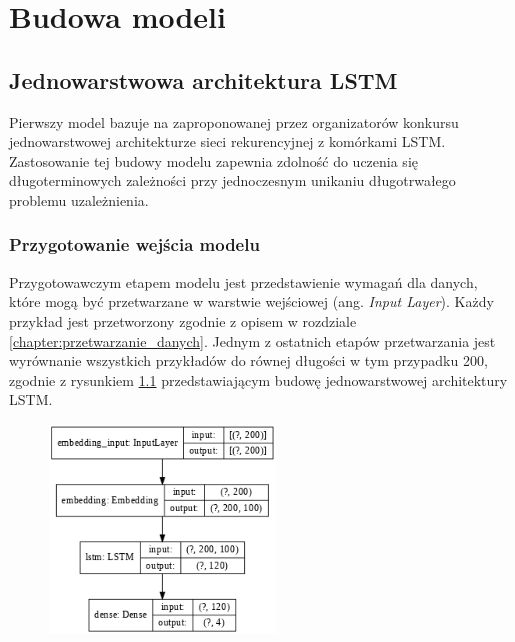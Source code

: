 \chapter{Budowa modeli}

\section{Jednowarstwowa architektura LSTM}
\label{section:one_lstm}

Pierwszy model bazuje na zaproponowanej przez organizatorów konkursu jednowarstwowej architekturze sieci rekurencyjnej z komórkami LSTM. Zastosowanie tej budowy modelu zapewnia zdolność do uczenia się długoterminowych zależności przy jednoczesnym unikaniu długotrwałego problemu uzależnienia. 

\subsection{Przygotowanie wejścia modelu}

Przygotowawczym etapem modelu jest przedstawienie wymagań dla danych, które mogą być przetwarzane w warstwie wejściowej (ang. \textit{Input Layer}). Każdy przykład jest przetworzony zgodnie z opisem w rozdziale \ref{chapter:przetwarzanie_danych}. Jednym z ostatnich etapów przetwarzania jest wyrównanie wszystkich przykładów do równej długości w tym przypadku 200, zgodnie z rysunkiem \ref{rys:lstm_one_graph} przedstawiającym budowę jednowarstwowej architektury LSTM.

\begin{figure}[t]
\centering\includegraphics[width=6cm]{figures/reports/lstm_one_graph.png}
\label{rys:lstm_one_graph}
\end{figure}


